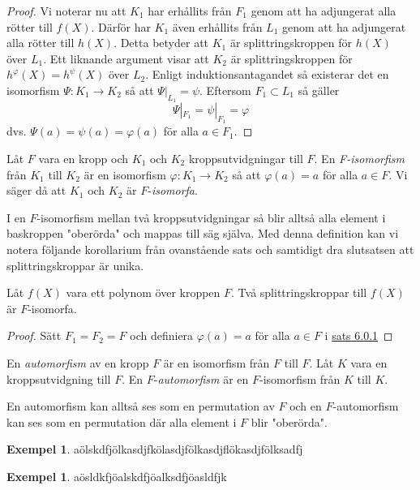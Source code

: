 \documentclass{article}
\theoremstyle{definition}
\newtheorem{exmp}[thm]{Exempel}
\begin{document}
\begin{proof}
Vi noterar nu att $K_1$ har erhållits från $F_1$ genom att ha adjungerat alla rötter till $f(X)$. Därför har $K_1$ även erhållits
från $L_1$ genom att ha adjungerat alla rötter till $h(X)$. Detta betyder att $K_1$ är splittringskroppen för $h(X)$ över $L_1$. Ett liknande 
argument visar att $K_2$ är splittringskroppen för $h^{\varphi}(X) = h^{\psi}(X)$ över $L_2$. Enligt induktionsantagandet så existerar det 
en isomorfism $\Psi: K_1 \rightarrow K_2$ så att $\Psi |_{L_1} = \psi$. Eftersom $F_1 \subset L_1$ så gäller 
\[\Psi |_{F_1} = \psi |_{F_1} = \varphi\]
dvs. $\Psi(a) = \psi(a) = \varphi(a)$ för alla $a \in F_1$. 
\end{proof}


\begin{mydef}{}{}
  Låt $F$ vara en kropp och $K_1$ och $K_2$ kroppsutvidgningar till $F$. En \textit{F-isomorfism} från $K_1$ till $K_2$ är en isomorfism 
  $\varphi: K_1 \rightarrow K_2$ så att $\varphi(a) = a$ för alla $a \in F.$ Vi säger då att $K_1$ och $K_2$ är $F$-\textit{isomorfa}.
\end{mydef}
I en $F$-isomorfism mellan två kroppsutvidgningar så blir alltså alla element i baskroppen "oberörda" och mappas till säg själva. Med denna definition 
kan vi notera följande korollarium från ovanstående sats och samtidigt dra slutsatsen att splittringskroppar är unika.

\hypertarget{kol6.2.1}{}
\begin{mykol}{}{}
  Låt $f(X)$ vara ett polynom över kroppen $F$. Två splittringskroppar till $f(X)$ är $F$-isomorfa. 
\end{mykol}
\begin{proof}
  Sätt $F_1 = F_2 = F$ och definiera $\varphi(a) = a$ för alla $a \in F$ i \hyperlink{sats6.0.1}{sats 6.0.1}
\end{proof}

\begin{mydef}{}{}
  En \textit{automorfism} av en kropp $F$ är en isomorfism från $F$ till $F$. Låt $K$ vara en kroppsutvidgning till $F$. En $F$-\textit{automorfism} 
  är en $F$-isomorfism från $K$ till $K.$
\end{mydef}
En automorfism kan alltså ses som en permutation av $F$ och en $F$-automorfism kan ses som en permutation där alla element i $F$ blir "oberörda".
\begin{exmp}
  aölskdfjölkasdjfkölasdjfölkasdjflökasdjfölksadfj
\end{exmp}
\begin{exmp}
  aösldkfjöalskdfjöalksdfjöasldfjk
\end{exmp}
\end{document}
